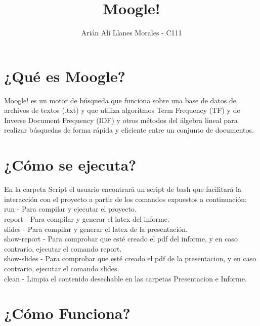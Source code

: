 \documentclass{article}
\begin{document}
\title{\textcolor{graphcolor}{\textbf{\Huge{Moogle!}}}}
\author{\LARGE{\textcolor{graphcolor}{Arián Alí Llanes Morales - C111}}}

\maketitle

\newpage

\begin{center}
\section*{\textcolor{graphcolor}{{\centering ¿Qué es Moogle?}}}

Moogle! es un motor de búsqueda que funciona sobre una base 
de datos de archivos de textos (.txt) y que utiliza algoritmos Term Frequency (TF) 
y de Inverse Document Frequency (IDF) y otros métodos del álgebra lineal para realizar búsquedas
 de forma rápida y eficiente entre un conjunto de documentos.

\section*{\textcolor{graphcolor}{{\centering ¿Cómo se ejecuta?}}}

	En la carpeta Script el usuario encontrará un script de bash que facilitará la interacción con el proyecto
a partir de los comandos expuestos a continuación:
\\run - Para compilar y ejecutar el proyecto.
\\report - Para compilar y generar el latex del informe.
\\slides - Para compilar y generar el latex de la presentación.
\\show-report - Para comprobar que esté creado el pdf del informe, y en caso contrario, ejecutar el comando report.
\\show-slides - Para comprobar que esté creado el pdf de la presentacion, y en caso contrario, ejecutar el comando slides.
\\clean - Limpia el contenido desechable en las carpetas Presentacion e Informe.     


\newpage

\section*{\textcolor{graphcolor}{{\centering ¿Cómo Funciona?}}}


\end{center}
\end{document}
